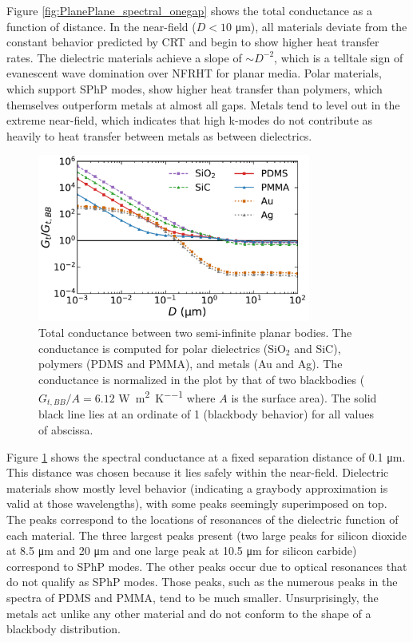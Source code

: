 Figure \ref{fig:PlanePlane_spectral_onegap} shows the total conductance as a function of distance. In the near-field ($D < 10$ \si{\micro\meter}), all materials deviate from the constant behavior predicted by CRT and begin to show higher heat transfer rates. The dielectric materials achieve a slope of $\sim D^{-2}$, which is a telltale sign of evanescent wave domination over NFRHT for planar media. Polar materials, which support SPhP modes, show higher heat transfer than polymers, which themselves outperform metals at almost all gaps. Metals tend to level out in the extreme near-field, which indicates that high k-modes do not contribute as heavily to heat transfer between metals as between dielectrics.

\begin{figure}
\centering
\includegraphics[width=0.8\textwidth]{./Figures/NFRHT_planeplane_total.pdf}
\caption{\label{fig:PlanePlane_total}Total conductance between two semi-infinite planar bodies. The conductance is computed for polar dielectrics (SiO$_{2}$ and SiC), polymers (PDMS and PMMA), and metals (Au and Ag). The conductance is normalized in the plot by that of two blackbodies ($G_{t,BB}/A = 6.12$ \si{\watt\per\square\meter\per\kelvin} where $A$ is the surface area). The solid black line lies at an ordinate of 1 (blackbody behavior) for all values of abscissa.}
\end{figure}

Figure \ref{fig:PlanePlane_total} shows the spectral conductance at a fixed separation distance of 0.1 \si{\micro\meter}. This distance was chosen because it lies safely within the near-field.  Dielectric materials show mostly level behavior (indicating a graybody approximation is valid at those wavelengths), with some peaks seemingly superimposed on top. The peaks correspond to the locations of resonances of the dielectric function of each material.\cite{Spitzer1959, Srinivasan2016, Tsuda2018} The three largest peaks present (two large peaks for silicon dioxide at 8.5 \si{\micro\meter} and 20 \si{\micro\meter} and one large peak at 10.5 \si{\micro\meter} for silicon carbide) correspond to SPhP modes. The other peaks occur due to optical resonances that do not qualify as SPhP modes. Those peaks, such as the numerous peaks in the spectra of PDMS and PMMA, tend to be much smaller. Unsurprisingly, the metals act unlike any other material and do not conform to the shape of a blackbody distribution.

